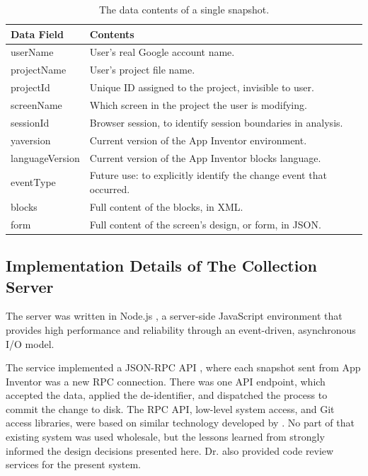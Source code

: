 \begin{table}
\begin{centering}
	\begin{tabular}{l l}
		Data Field 			& Contents \\ \hline
		userName  			& User's real Google account name. \\
		projectName 		& User's project file name. 	\\
		projectId 			& Unique ID assigned to the project, invisible to user.	\\
		screenName 			& Which screen in the project the user is modifying.	\\
		sessionId 			& Browser session, to identify session boundaries in analysis.	\\
		yaversion 			& Current version of the App Inventor environment. 	\\
		languageVersion 	& Current version of the App Inventor blocks language. 	\\
		eventType 			& Future use: to explicitly identify the change event that occurred. 	\\
		blocks 				& Full content of the blocks, in XML. 	\\
		form 				& Full content of the screen's design, or form, in JSON.

	\end{tabular}
	\caption[Contents of a Snapshot]{The data contents of a single snapshot.}
	\label{tab:snapshotPayload}
\end{centering}
\end{table}

\subsection{Implementation Details of The Collection Server}
The server was written in Node.js \citep{nodejs}, a server-side JavaScript environment that provides high performance and reliability through an event-driven, asynchronous I/O model. %

The service implemented a JSON-RPC API \citep{jsonrpc}, where each snapshot sent from App Inventor was a new RPC connection. There was one API endpoint, which accepted the data, applied the de-identifier, and dispatched the process to commit the change to disk. The RPC API, low-level system access, and Git access libraries, were based on similar technology developed by \citet{lipman-2011}. No part of that existing system was used wholesale, but the lessons learned from \citet{lipman-2014} strongly informed the design decisions presented here. Dr. \citeauthor{lipman-2014} also provided code review services for the present system. %

